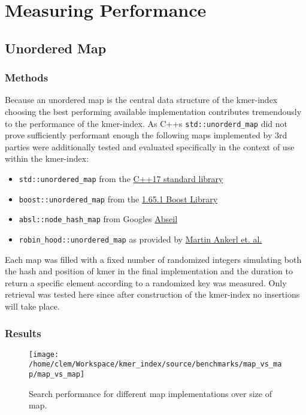 \chapter{Measuring Performance}

\begin{minipage}{\linewidth}
\section{Unordered Map}
\subsection{Methods}
Because an unordered map is the central data structure of the kmer-index choosing the best performing available
implementation contributes tremendously to the performance of the kmer-index. As C++s \lstinline{std::unorderd_map}
did not prove sufficiently performant enough the following maps implemented by 3rd parties were additionally tested and evaluated
specifically in the context of use within the kmer-index:

\begin{itemize}
\item \lstinline{std::unordered_map} from the \href{https://en.cppreference.com/w/cpp/container/unordered_map}{C++17 standard library}
\item \lstinline{boost::unordered_map} from the \href{https://www.boost.org/doc/libs/1_65_0/doc/html/boost/unordered_map.html}{1.65.1 Boost Library}
\item \lstinline{absl::node_hash_map} from Googles \href{https://abseil.io/docs/cpp/guides/container\#abslnode_hash_map-and-abslnode_hash_set}{Abseil}
\item \lstinline{robin_hood::unordered_map} as provided by \href{https://github.com/martinus/robin-hood-hashing}{Martin Ankerl et. al.}
\end{itemize}

Each map was filled with a fixed number of randomized integers simulating both the hash and position of kmer in the
final implementation and the duration to return a specific element according to a randomized key was measured.
Only retrieval was tested here since after construction of the kmer-index no insertions will take place.

\subsection{Results}
\begin{figure}[H] \label{}
\texttt{[image: /home/clem/Workspace/kmer\_index/source/benchmarks/map\_vs\_map/map\_vs\_map]}

\caption{Search performance for different map implementations over size of
map.}
\end{figure}
\end{minipage}

